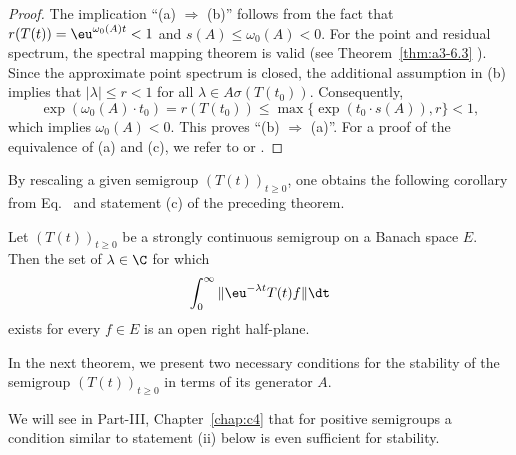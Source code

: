 \begin{proof} The implication ``(a) $ \Rightarrow $ (b)'' follows from the fact that $ r(T(t)) = \eu^{\omega_{0}(A) t} < 1 $ and $ s(A) \leq \omega_{0}(A) < 0 $. For the point and residual spectrum, the spectral mapping theorem is valid (see Theorem~\ref{thm:a3-6.3} ). Since the approximate point spectrum is closed, the additional assumption in (b)
implies that $ |\lambda| \leq r < 1 $ for all $ \lambda \in A\sigma(T(t_0)) $. 
Consequently, 
\[
\exp(\omega_{0}(A) \cdot t_0) = r(T(t_0)) \leq \max\{\exp(t_0 \cdot s(A)), r\} < 1,
\]
which implies $ \omega_{0}(A) < 0 $. 
This proves \textquotedblleft (b) $\Rightarrow$ (a)\textquotedblright. 
For a proof of the equivalence of (a) and (c), we refer to \textcite{datko:1972} or \textcite[Theorem~4.4.1]{pazy:1983}. 
\end{proof}
By rescaling a given semigroup $ (T(t))_{t \geq 0} $, one obtains the following corollary from Eq.~ and statement (c) of the preceding theorem.
\begin{corollary} \label{cor:a4-1.12} 
Let $ (T(t))_{t \geq 0} $ be a strongly continuous semigroup on a Banach space $ E $. Then the set of\/ $ \lambda \in \C$ for which
\[
\int_{0}^{\infty} \|\eu^{-\lambda t} T (t) f \|  \dt 
\]
exists for every $ f \in E $  is an open right half-plane.
\end{corollary}
In the next theorem, we present two necessary conditions for the stability of the semigroup $ (T(t))_{t \geq 0} $ in terms of its generator $ A $. 

We will see in Part-III, Chapter~\ref{chap:c4} that for positive semigroups a condition similar to statement (ii) below is even sufficient for stability. 

